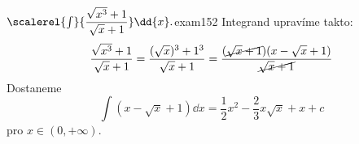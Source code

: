 \begin{mathexam}{\(\protect\scalerel{\int}{\dfrac{\sqrt{x^3}+1}{\sqrt{x}+1}}\dd{x}.\)}{exam152} 
  Integrand upravíme takto: 
  \begin{equation*}
    \dfrac{\sqrt{x^3}+1}{\sqrt{x}+1} = \dfrac{(\sqrt{x})^3+1^3}{\sqrt{x}+1}
      = \dfrac{(\cancel{\sqrt{x} + 1})(x-\sqrt{x}+1)}{\cancel{\sqrt{x}+1}}
  \end{equation*}
  Dostaneme
  \[\int(x-\sqrt{x}+1)\dd{x} = \dfrac{1}{2}x^2 - \dfrac{2}{3}x\sqrt{x} + x +c\] pro
  \(x\in(0,+\infty)\). 
\end{mathexam}
